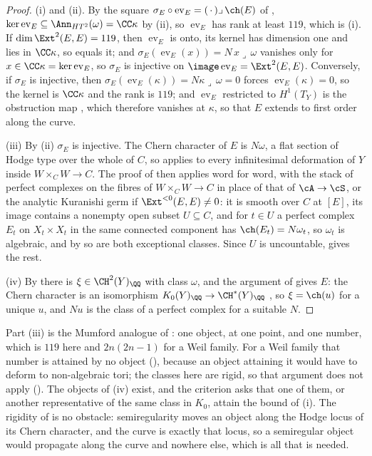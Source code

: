\begin{proof}
(i) and (ii). By the square $\sigma_{E}\circ\operatorname{ev}_{E}=
(\,\cdot\,)\lrcorner\,\ch(E)$ of \cite[Setup~4.54]{paperII}, $\ker
\operatorname{ev}_{E}\subseteq\Ann_{HT^{2}}(\omega)=\CC\kappa$ by
(ii), so $\operatorname{ev}_{E}$ has rank at least
$119$, which is (i). If $\dim\Ext^{2}(E,E)=119$, then
$\operatorname{ev}_{E}$ is onto, its kernel has dimension one and lies in
$\CC\kappa$, so equals it; and $\sigma_{E}(\operatorname{ev}_{E}(x))=
N\,x\lrcorner\,\omega$ vanishes only for $x\in\CC\kappa=\ker
\operatorname{ev}_{E}$, so $\sigma_{E}$ is injective on
$\image\operatorname{ev}_{E}=\Ext^{2}(E,E)$. Conversely, if $\sigma_{E}$ is
injective, then $\sigma_{E}(\operatorname{ev}_{E}(\kappa))=N\kappa\lrcorner
\,\omega=0$ forces $\operatorname{ev}_{E}(\kappa)=0$, so the kernel is
$\CC\kappa$ and the rank is $119$; and $\operatorname{ev}_{E}$ restricted to
$H^{1}(T_{Y})$ is the obstruction map \cite{Tod09}, which therefore vanishes
at $\kappa$, so that $E$ extends to first order along the curve.

(iii) By (ii) $\sigma_{E}$ is injective. The Chern character of $E$ is
$N\omega$, a flat section of Hodge type over the whole of $C$, so
\cite[Theorem~2.2]{paperII} applies to every infinitesimal deformation of $Y$ inside
$W\times_{C}W\to C$. The proof of \cite[Theorem~2.3]{paperII} then applies word
for word, with the stack of perfect complexes on the fibres of $W\times_{C}
W\to C$ \cite{Lie06} in place of that of $\cA\to\cS$, or the analytic
Kuranishi germ if $\Ext^{<0}(E,E)\ne0$: it is smooth over $C$ at $[E]$, its
image contains a nonempty open subset $U\subseteq C$, and for $t\in U$ a
perfect complex $E_{t}$ on $X_{t}\times X_{t}$ in the same connected
component has $\ch(E_{t})=N\omega_{t}$, so $\omega_{t}$ is algebraic, and by
 so are both exceptional classes. Since $U$ is
uncountable,  gives the rest.

(iv) By  there is $\xi\in\CH^{2}(Y)_{\QQ}$ with class
$\omega$, and the argument of \cite[Proposition~2.1]{paperII} gives $E$: the Chern
character is an isomorphism $K_{0}(Y)_{\QQ}\to\CH^{*}(Y)_{\QQ}$
\cite[Ex.~15.2.16(b) and Cor.~18.3.2]{Ful98}, so $\xi=\ch(u)$ for a unique
$u$, and $Nu$ is the class of a perfect complex for a suitable $N$.
\end{proof}

Part (iii) is the Mumford analogue of \cite[Theorem~2.11(iii)]{paperII}: one object,
at one point, and one number, which is $119$ here and $2n(2n-1)$ for a Weil
family. For a Weil family that number is attained by no object
(\cite[Theorem~3.5]{paperII}), because an object attaining it would have to deform to
non-algebraic tori; the classes here are rigid, so that argument does not
apply (\cite[Remark~3.6]{paperII}). The objects of (iv) exist, and the criterion
asks that one of them, or another representative of the same class in
$K_{0}$, attain the bound of (i). The rigidity of  is no obstacle:
semiregularity moves an object along the Hodge locus of its Chern character,
and the curve is exactly that locus, so a semiregular object would propagate
along the curve and nowhere else, which is all that is needed.


